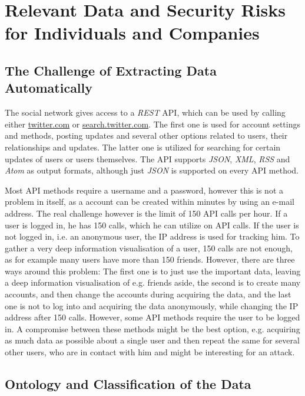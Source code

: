 \section{Relevant Data and Security Risks for Individuals and Companies}
\label{sec:relevant_data}

\subsection{The Challenge of Extracting Data Automatically}

The \Twitter{} social network gives access to a \textit{REST} API, which can be
used by calling either \url{twitter.com} or \url{search.twitter.com}. The first
one is used for account settings and methods, posting updates and several other
options related to users, their relationships and updates. The latter one is
utilized for searching for certain updates of users or users themselves. The
API supports \textit{JSON}, \textit{XML}, \textit{RSS} and \textit{Atom} as
output formats, although just \textit{JSON} is supported on every API method.

Most API methods require a username and a password, however this is not a
problem in itself, as a \Twitter{} account can be created within minutes by
using an e-mail address. The real challenge however is the limit of 150 API
calls per hour. If a user is logged in, he has 150 calls, which he can
utilize on API calls. If the user is not logged in, i.e. an anonymous user, the IP
address is used for tracking him. To gather a very deep information
visualisation of a user, 150 calls are not enough, as for example many users
have more than 150 friends. However, there are three ways around this problem:
The first one is to just use the important data, leaving a deep information
visualisation of e.g. friends aside, the second is to create many accounts, and
then change the accounts during acquiring the data, and the last one is not to log
into \Twitter{} and acquiring the data anonymously, while changing the IP
address after 150 calls. However, some API methods require the user to be
logged in. A compromise between these methods might be the best option,
e.g. acquiring as much data as possible about a single user and then repeat the
same for several other users, who are in contact with him and might be
interesting for an attack.

\subsection{Ontology and Classification of the Data}
\label{ssec:ontology}

